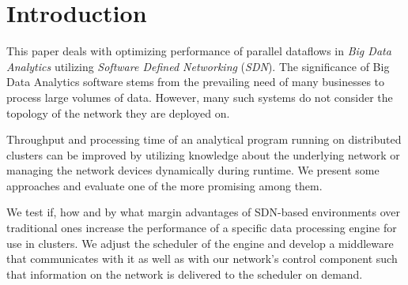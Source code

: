 \section{Introduction}
This paper deals with optimizing performance of parallel dataflows in \textit{Big Data Analytics}
utilizing \textit{Software Defined Networking} (\textit{SDN}). The significance of Big Data
Analytics software stems from the prevailing need of many businesses to process large volumes of
data. However, many such systems do not consider the topology of the network they are deployed on.

Throughput and processing time of an analytical program running on distributed clusters can be
improved by utilizing knowledge about the underlying network or managing the network devices
dynamically during runtime. We present some approaches and evaluate one of the more promising among
them.

We test if, how and by what margin advantages of SDN-based environments over traditional ones
increase the performance of a specific data processing engine for use in clusters. We adjust the
scheduler of the engine and develop a middleware that communicates with it as well as with our
network’s control component such that information on the network is delivered to the scheduler on
demand.
